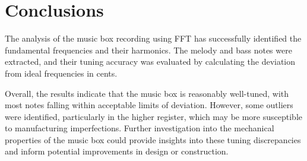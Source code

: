 \chapter{Conclusions}

The analysis of the music box recording using FFT has successfully identified the fundamental frequencies and their harmonics. The melody and bass notes were extracted, and their tuning accuracy was evaluated by calculating the deviation from ideal frequencies in cents.

Overall, the results indicate that the music box is reasonably well-tuned, with most notes falling within acceptable limits of deviation. However, some outliers were identified, particularly in the higher register, which may be more susceptible to manufacturing imperfections. Further investigation into the mechanical properties of the music box could provide insights into these tuning discrepancies and inform potential improvements in design or construction.
